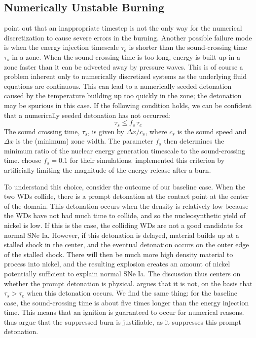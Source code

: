 \documentclass[twocolumn,numberedappendix]{../aastex6}
\begin{document}
\subsection{Numerically Unstable Burning}
\label{sec:unstable_burning}

\citet{kushnir:2013} point out that an inappropriate timestep is 
not the only way for the numerical discretization to cause 
severe errors in the burning. Another possible failure mode is when
the energy injection timescale
$\tau_e$ is shorter than the sound-crossing time $\tau_s$ in a zone.
When the sound-crossing time is too long, energy is built up in
a zone faster than it can be advected away by pressure waves.
This is of course a problem inherent only to numerically discretized
systems as the underlying fluid equations are continuous.
This can lead to a numerically seeded detonation caused by the
temperature building up too quickly in the zone; the detonation
may be spurious in this case. If the following condition holds,
we can be confident that a numerically seeded detonation has not occurred:
\begin{equation}
  \tau_s \leq f_{s}\, \tau_e \label{eq:burning_limiter_2}
\end{equation}
The sound crossing time, $\tau_s$, is given by $\Delta x / c_s$, 
where $c_s$ is the sound speed and $\Delta x$ is the (minimum) 
zone width. The parameter $f_{s}$ then determines the minimum
ratio of the nuclear energy generation timescale to the 
sound-crossing time. \citet{kushnir:2013} choose $f_{s} = 0.1$ 
for their simulations. \citet{kushnir:2013} implemented this
criterion by artificially limiting the magnitude of the energy
release after a burn.

To understand this choice, consider the outcome of our baseline case.
When the two WDs collide, there is a prompt detonation
at the contact point at the center of the domain. This detonation occurs
when the density is relatively low because the WDs have not had much
time to collide, and so the nucleosynthetic yield of nickel is low. If
this is the case, the colliding WDs are not a good candidate for
normal SNe Ia. However, if this detonation is delayed, material builds
up at a stalled shock in the center, and the eventual detonation occurs
on the outer edge of the stalled shock. There will then be much more
high density material to process into nickel, and the resulting
explosion creates an amount of nickel potentially sufficient to explain
normal SNe Ia. The discussion thus centers on whether the prompt detonation
is physical. \citeauthor{kushnir:2013} argues that it is not, on the basis
that $\tau_s > \tau_e$ when this detonation occurs. We find the same thing:
for the baseline case, the sound-crossing time is about five times longer
than the energy injection time. This means that an ignition is guaranteed
to occur for numerical reasons. \citeauthor{kushnir:2013} thus argue that
the suppressed burn is justifiable, as it suppresses this prompt detonation.
\end{document}
